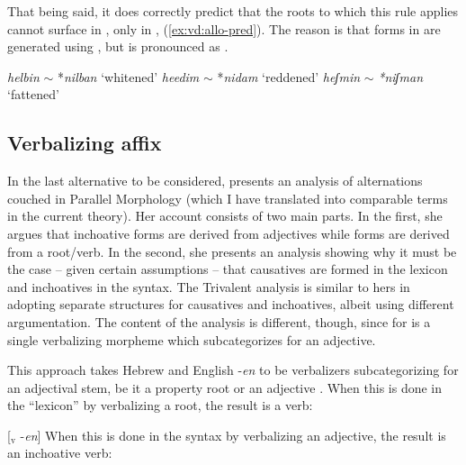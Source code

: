 \begin{exe}
\begin{xlist}
\begin{xlist}
\begin{exe}
\begin{exe}
\begin{xlist}
\begin{exe}
\begin{xlist}
\begin{exe}
\begin{xlist}
\begin{xlist}
\begin{exe}
\begin{xlist}
\begin{exe}
\begin{xlist}
\begin{exe}
\begin{xlist}
\begin{exe}
\begin{exe}
\begin{exe}
\begin{xlist}
\begin{exe}
\begin{exe}
\begin{xlist}
\begin{xlist}
\begin{exe}
\begin{xlist}
\begin{exe}
\begin{exe}
\begin{xlist}
\begin{exe}
\begin{exe}
\begin{xlist}
\begin{exe}
\begin{xlist}
\begin{exe}
\begin{xlist}
\begin{exe}
\begin{xlist}
\begin{exe}
\begin{exe}
\begin{xlist}
\begin{exe}
\begin{exe}
\begin{xlist}
\begin{xlist}
\begin{exe}
\begin{xlist}
\begin{xlist}
\begin{exe}
\begin{xlist}
\begin{exe}
\begin{xlist}
\begin{exe}
\begin{xlist}
\begin{exe}
\begin{xlist}
\begin{exe}
\begin{exe}
\begin{exe}
\begin{exe}
\begin{xlist}
\begin{exe}
\begin{exe}
\begin{xlist}
\begin{xlist}
\begin{exe}
\begin{exe}
\begin{xlist}
\begin{exe}
\begin{xlist}
\begin{exe}
\begin{xlist}
\begin{exe}
\begin{xlist}
That being said, it does correctly predict that the roots to which this rule applies cannot surface in {\tnif}, only in {\thit}, (\ref{ex:vd:allo-pred}). The reason is that forms in {\tnif} are generated using {\vz}, but {\vz} is pronounced as {\thif}.

 \begin{exe}
\ex \label{ex:vd:allo-pred} 
	\begin{xlist}
		\ex  \emph{helbin} $\sim$ *\emph{nilban} `whitened' 
		\ex \emph{heedim} $\sim$ *\emph{nidam} `reddened'
		\ex \emph{heʃmin} $\sim$ \emph{*niʃman} `fattened'
	\z
 \z 

	\subsection{Verbalizing affix} \label{vd:others:borer}
In the last alternative to be considered, \cite{borer91} presents an analysis of {\thif} alternations couched in Parallel Morphology (which I have translated into comparable terms in the current theory). Her account consists of two main parts. In the first, she argues that inchoative forms are derived from adjectives while  forms are derived from a root/verb. In the second, she presents an analysis showing why it must be the case -- given certain assumptions -- that causatives are formed in the lexicon and inchoatives in the syntax. The Trivalent analysis is similar to hers in adopting separate structures for causatives and inchoatives, albeit using different argumentation. The content of the analysis is different, though, since for \cite{borer91} {\thif} is a single verbalizing morpheme which subcategorizes for an adjective.

This approach takes Hebrew {\thif} and English -\emph{en} to be verbalizers subcategorizing for an adjectival stem, be it a property root or an adjective \citep[136]{borer91}. 
When this is done in the ``lexicon'' by verbalizing a root, the result is a  verb:
 \begin{exe}
\ex \label{ex:vd:thif-borer-caus}{[}$_{\text{v}}$  -\emph{en}] 
 \z 
When this is done in the syntax by verbalizing an adjective, the result is an inchoative verb:
 \begin{exe}
\ex 
\end{exe}
\end{exe}
\end{xlist}
\end{exe}
\end{xlist}
\end{exe}
\end{xlist}
\end{exe}
\end{xlist}
\end{exe}
\end{xlist}
\end{exe}
\end{exe}
\end{xlist}
\end{xlist}
\end{exe}
\end{exe}
\end{xlist}
\end{exe}
\end{exe}
\end{exe}
\end{exe}
\end{xlist}
\end{exe}
\end{xlist}
\end{exe}
\end{xlist}
\end{exe}
\end{xlist}
\end{exe}
\end{xlist}
\end{xlist}
\end{exe}
\end{xlist}
\end{xlist}
\end{exe}
\end{exe}
\end{xlist}
\end{exe}
\end{exe}
\end{xlist}
\end{exe}
\end{xlist}
\end{exe}
\end{xlist}
\end{exe}
\end{xlist}
\end{exe}
\end{exe}
\end{xlist}
\end{exe}
\end{exe}
\end{xlist}
\end{exe}
\end{xlist}
\end{xlist}
\end{exe}
\end{exe}
\end{xlist}
\end{exe}
\end{exe}
\end{exe}
\end{xlist}
\end{exe}
\end{xlist}
\end{exe}
\end{xlist}
\end{exe}
\end{xlist}
\end{xlist}
\end{exe}
\end{xlist}
\end{exe}
\end{xlist}
\end{exe}
\end{exe}
\end{xlist}
\end{xlist}
\end{exe}
